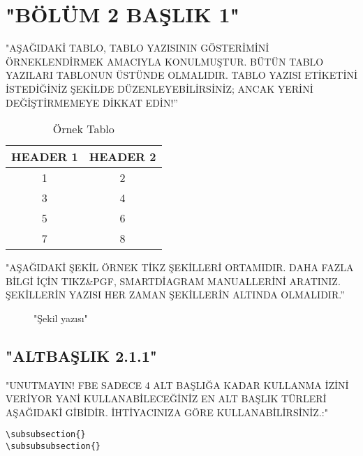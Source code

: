 \documentclass[12pt]{report}
\begin{document}
\section{"BÖLÜM 2 BAŞLIK 1"}
\label{sec: "BAŞLIK 1"}

"AŞAĞIDAKİ TABLO, TABLO YAZISININ GÖSTERİMİNİ ÖRNEKLENDİRMEK AMACIYLA KONULMUŞTUR. BÜTÜN TABLO YAZILARI TABLONUN ÜSTÜNDE OLMALIDIR. TABLO YAZISI ETİKETİNİ İSTEDİĞİNİZ ŞEKİLDE DÜZENLEYEBİLİRSİNİZ; ANCAK YERİNİ DEĞİŞTİRMEMEYE DİKKAT EDİN!''
\begin{table}
	\begin{center}
	\caption{Örnek Tablo\label{tab: etiket1}}
		\begin{tabular}{| c | c |}
		\hline
		HEADER 1  & HEADER 2 \\
		\hline
		1 & 2 \\
		\hline
		3 & 4 \\
		\hline
		5  & 6 \\
		\hline
		7 & 8 \\
		\hline
		\end{tabular}
	\end{center}
\end{table}

"AŞAĞIDAKİ ŞEKİL ÖRNEK TİKZ ŞEKİLLERİ ORTAMIDIR. DAHA FAZLA BİLGİ İÇİN TIKZ\&PGF, SMARTDİAGRAM MANUALLERİNİ ARATINIZ. ŞEKİLLERİN YAZISI HER ZAMAN ŞEKİLLERİN ALTINDA OLMALIDIR.''

\begin{figure}[h]
	\begin{center}
	\end{center}
	\caption{"Şekil yazısı" \label{fig: "şekil etiketi"}}
\end{figure}

\subsection{"ALTBAŞLIK 2.1.1"}
\label{sec: "BURAYA ETİKETK"}
"UNUTMAYIN! FBE SADECE 4 ALT BAŞLIĞA KADAR KULLANMA İZİNİ VERİYOR YANİ KULLANABİLECEĞİNİZ EN ALT BAŞLIK TÜRLERİ AŞAĞIDAKİ GİBİDİR. İHTİYACINIZA GÖRE KULLANABİLİRSİNİZ.:"
\begin{verbatim}
\subsubsection{}
\subsubsubsection{}
\end{verbatim}
\end{document}
